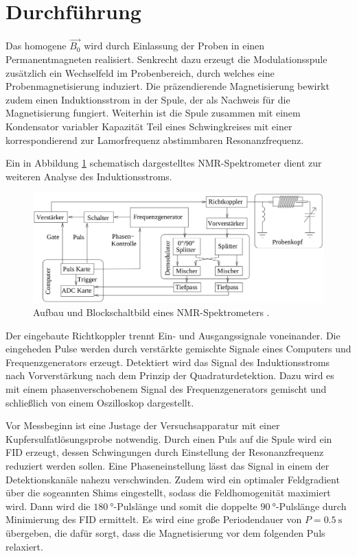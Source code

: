 \section{Durchführung}
\label{sec:Durchführung}

Das homogene $\vec{B_0}$ wird durch Einlassung der Proben in einen Permanentmagneten 
realisiert. Senkrecht dazu erzeugt die Modulationsspule zusätzlich ein Wechselfeld im Probenbereich,
durch welches eine Probenmagnetisierung induziert. Die präzendierende Magnetisierung
bewirkt zudem einen Induktionsstrom in der Spule, der als Nachweis für die Magnetisierung fungiert.
Weiterhin ist die Spule zusammen mit einem Kondensator variabler Kapazität Teil eines Schwingkreises
mit einer korrespondierend zur Lamorfrequenz abstimmbaren Resonanzfrequenz.

Ein in Abbildung \ref{fig:aufbau} schematisch dargestelltes NMR-Spektrometer dient zur weiteren
Analyse des Induktionsstroms.

\begin{figure}
    \centering
    \includegraphics[scale=0.4]{content/aufbau.png}
    \caption{Aufbau und Blockschaltbild eines NMR-Spektrometers \cite{Anleitung2}.}
    \label{fig:aufbau}
\end{figure}

Der eingebaute Richtkoppler trennt Ein- und Ausgangssignale voneinander.
Die eingeheden Pulse werden durch verstärkte gemischte Signale eines Computers und Frequenzgenerators erzeugt.
Detektiert wird das Signal des Induktionsstroms nach Vorverstärkung nach dem Prinzip der Quadraturdetektion.
Dazu wird es mit einem phasenverschobenem Signal des Frequenzgenerators gemischt und schließlich von einem
Oszilloskop dargestellt.

Vor Messbeginn ist eine Justage der Versuchsapparatur mit einer Kupfersulfatlösungsprobe notwendig.
Durch einen Puls auf die Spule wird ein FID erzeugt, dessen Schwingungen durch Einstellung der Resonanzfrequenz
reduziert werden sollen. Eine Phaseneinstellung lässt das Signal in einem der Detektionskanäle
nahezu verschwinden.
Zudem wird ein optimaler Feldgradient über die sogeannten Shims eingestellt, sodass die 
Feldhomogenität maximiert wird.
Dann wird die $\SI{180}{\degree}$-Pulslänge und somit die doppelte $\SI{90}{\degree}$-Pulslänge
durch Minimierung des FID ermittelt.
Es wird eine große Periodendauer von $P = \SI{0.5}{\second}$ übergeben, die dafür sorgt,
dass die Magnetisierung vor dem folgenden Puls relaxiert.

